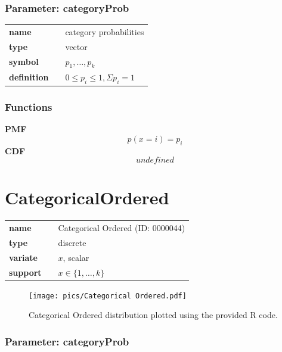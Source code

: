 \documentclass{article}
\begin{document}
\subsubsection*{Parameter: categoryProb}

\noindent\begin{tabular}{p{2cm}cl}
\textbf{name} & & category probabilities \\
\textbf{type} & & vector \\
\textbf{symbol} & & $p_1, \ldots, p_k$  \\
\textbf{definition} & & $0 \leq p_i \leq 1, \Sigma p_i = 1$
\end{tabular}
\subsubsection*{Functions}

\smallskip \noindent \hspace{.2cm} \textbf{PMF} 
\begin{equation*}p(x=i)=p_i\end{equation*}
\smallskip \noindent \hspace{.2cm} \textbf{CDF} 
\begin{equation*}undefined\end{equation*}
\smallskip\section*{CategoricalOrdered} 

  \bigskip 

\begin{tabular}{p{2cm}cl}
\textbf{name} & & Categorical Ordered (ID: 0000044)\\ 
 
\textbf{type} & & discrete \\ 

\textbf{variate} & & $x$, scalar \\ 

\textbf{support} & & $x \in \{1,\dots,k\}$
\end{tabular}

\begin{figure}[ht!]
\centering
  \texttt{[image: pics/Categorical Ordered.pdf]}
 \caption{Categorical Ordered distribution plotted using the provided R code.}
 \label{fig:Categorical Ordered}
\end{figure}

\subsubsection*{Parameter: categoryProb}
\end{document}
